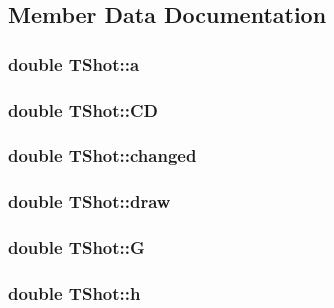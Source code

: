 \subsection{Member Data Documentation}
\subsubsection[{\texorpdfstring{a}{a}}]{\setlength{\rightskip}{0pt plus 5cm}double T\+Shot\+::a}\hypertarget{struct_t_shot_a15a6a1f4d0e4fa8d2922746d3718c645}{}\label{struct_t_shot_a15a6a1f4d0e4fa8d2922746d3718c645}
\subsubsection[{\texorpdfstring{CD}{CD}}]{\setlength{\rightskip}{0pt plus 5cm}double T\+Shot\+::\+CD}\hypertarget{struct_t_shot_a0b8bd704b499d9e24249e5c35e526fc4}{}\label{struct_t_shot_a0b8bd704b499d9e24249e5c35e526fc4}
\subsubsection[{\texorpdfstring{changed}{changed}}]{\setlength{\rightskip}{0pt plus 5cm}double T\+Shot\+::changed}\hypertarget{struct_t_shot_ac06afbb79a97feeef328bd6e985105ae}{}\label{struct_t_shot_ac06afbb79a97feeef328bd6e985105ae}
\subsubsection[{\texorpdfstring{draw}{draw}}]{\setlength{\rightskip}{0pt plus 5cm}double T\+Shot\+::draw}\hypertarget{struct_t_shot_aec72c87adc6f131dc80d154480edf585}{}\label{struct_t_shot_aec72c87adc6f131dc80d154480edf585}
\subsubsection[{\texorpdfstring{G}{G}}]{\setlength{\rightskip}{0pt plus 5cm}double T\+Shot\+::G}\hypertarget{struct_t_shot_aca3a4d1732cb311375e514137d8ddae2}{}\label{struct_t_shot_aca3a4d1732cb311375e514137d8ddae2}
\subsubsection[{\texorpdfstring{h}{h}}]{\setlength{\rightskip}{0pt plus 5cm}double T\+Shot\+::h}\hypertarget{struct_t_shot_a78e053ce9c33e588e8c6220c19163f77}{}\label{struct_t_shot_a78e053ce9c33e588e8c6220c19163f77}
